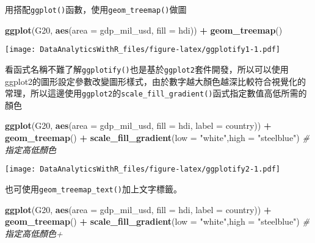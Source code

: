 \documentclass[
]{book}
\newenvironment{Shaded}{\begin{snugshade}}{\end{snugshade}}
\newcommand{\CommentTok}[1]{\textcolor[rgb]{0.56,0.35,0.01}{\textit{#1}}}
\newcommand{\DataTypeTok}[1]{\textcolor[rgb]{0.13,0.29,0.53}{#1}}
\newcommand{\KeywordTok}[1]{\textcolor[rgb]{0.13,0.29,0.53}{\textbf{#1}}}
\newcommand{\NormalTok}[1]{#1}
\newcommand{\OperatorTok}[1]{\textcolor[rgb]{0.81,0.36,0.00}{\textbf{#1}}}
\newcommand{\StringTok}[1]{\textcolor[rgb]{0.31,0.60,0.02}{#1}}
\begin{document}
用搭配\texttt{ggplot()}函數，使用\texttt{geom\_treemap()}做圖

\begin{Shaded}
\begin{Highlighting}[]
\KeywordTok{ggplot}\NormalTok{(G20, }\KeywordTok{aes}\NormalTok{(}\DataTypeTok{area =}\NormalTok{ gdp_mil_usd, }\DataTypeTok{fill =}\NormalTok{ hdi)) }\OperatorTok{+}
\StringTok{  }\KeywordTok{geom_treemap}\NormalTok{()}
\end{Highlighting}
\end{Shaded}

\texttt{[image: DataAnalyticsWithR\_files/figure-latex/ggplotify1-1.pdf]}

看函式名稱不難了解\texttt{ggplotify()}也是基於\texttt{ggplot2}套件開發，所以可以使用ggplot2的圖形設定參數改變圖形樣式，由於數字越大顏色越深比較符合視覺化的常理，所以這邊使用\texttt{ggplot2}的\texttt{scale\_fill\_gradient()}函式指定數值高低所需的顏色

\begin{Shaded}
\begin{Highlighting}[]
\KeywordTok{ggplot}\NormalTok{(G20, }\KeywordTok{aes}\NormalTok{(}\DataTypeTok{area =}\NormalTok{ gdp_mil_usd, }\DataTypeTok{fill =}\NormalTok{ hdi, }\DataTypeTok{label =}\NormalTok{ country)) }\OperatorTok{+}
\StringTok{  }\KeywordTok{geom_treemap}\NormalTok{() }\OperatorTok{+}\StringTok{ }
\StringTok{    }\KeywordTok{scale_fill_gradient}\NormalTok{(}\DataTypeTok{low =} \StringTok{"white"}\NormalTok{,}\DataTypeTok{high =} \StringTok{"steelblue"}\NormalTok{) }\CommentTok{#指定高低顏色}
\end{Highlighting}
\end{Shaded}

\texttt{[image: DataAnalyticsWithR\_files/figure-latex/ggplotify2-1.pdf]}

也可使用\texttt{geom\_treemap\_text()}加上文字標籤。

\begin{Shaded}
\begin{Highlighting}[]
\KeywordTok{ggplot}\NormalTok{(G20, }\KeywordTok{aes}\NormalTok{(}\DataTypeTok{area =}\NormalTok{ gdp_mil_usd, }\DataTypeTok{fill =}\NormalTok{ hdi, }\DataTypeTok{label =}\NormalTok{ country)) }\OperatorTok{+}
\StringTok{  }\KeywordTok{geom_treemap}\NormalTok{() }\OperatorTok{+}\StringTok{ }
\StringTok{  }\KeywordTok{scale_fill_gradient}\NormalTok{(}\DataTypeTok{low =} \StringTok{"white"}\NormalTok{,}\DataTypeTok{high =} \StringTok{"steelblue"}\NormalTok{) }\CommentTok{#指定高低顏色+}
\end{Highlighting}
\end{Shaded}
\end{document}
